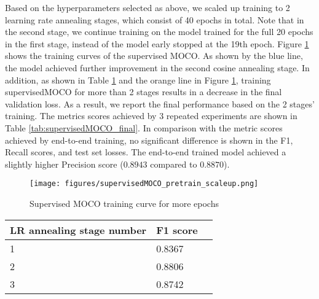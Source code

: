 \documentclass[12pt,twoside]{report}
\begin{document}
Based on the hyperparameters selected as above, we scaled up training to 2 learning rate annealing stages, which consist of 40 epochs in total. Note that in the second stage, we continue training on the model trained for the full 20 epochs in the first stage, instead of the model early stopped at the 19th epoch. Figure \ref{fig:supervisedMOCO_pretraining_final_curve} shows the training curves of the supervised MOCO. As shown by the blue line, the model achieved further improvement in the second cosine annealing stage. In addition, as shown in Table \ref{tab:supervisedMOCO_multistage} and the orange line in Figure \ref{fig:supervisedMOCO_pretraining_final_curve}, training supervisedMOCO for more than 2 stages results in a decrease in the final validation loss. As a result, we report the final performance based on the 2 stages' training. The metrics scores achieved by 3 repeated experiments are shown in Table \ref{tab:supervisedMOCO_final}. In comparison with the metric scores achieved by end-to-end training, no significant difference is shown in the F1, Recall scores, and test set losses. The end-to-end trained model achieved a slightly higher Precision score ($0.8943$ compared to $0.8870$). \\

\begin{figure}
    \centering
    \texttt{[image: figures/supervisedMOCO\_pretrain\_scaleup.png]}
    \caption{Supervised MOCO training curve for more epochs}
    \label{fig:supervisedMOCO_pretraining_final_curve}
\end{figure}

\begin{table}[]
    \centering
    \begin{tabular}{lll}
    \toprule
    LR annealing stage number & F1 score \\
    \midrule
    1 & 0.8367 \\
    2 & 0.8806 \\
    3 & 0.8742 \\
    \bottomrule
    \end{tabular}
    \captionsetup{type=table}
    \label{tab:supervisedMOCO_multistage}
\end{table}
\end{document}
